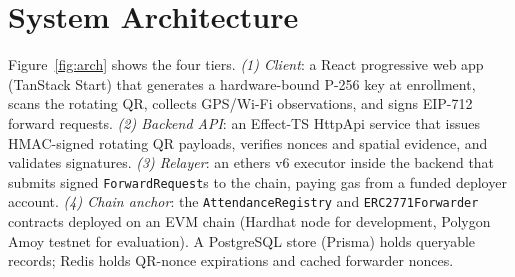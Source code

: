 \documentclass[conference]{IEEEtran}
\begin{document}
\section{System Architecture}
Figure~\ref{fig:arch} shows the four tiers. \emph{(1) Client}: a React
progressive web app (TanStack Start) that generates a hardware-bound P-256 key
at enrollment, scans the rotating QR, collects GPS/Wi-Fi observations, and
signs EIP-712 forward requests. \emph{(2) Backend API}: an Effect-TS HttpApi
service that issues HMAC-signed rotating QR payloads, verifies nonces and
spatial evidence, and validates signatures. \emph{(3) Relayer}: an ethers v6
executor inside the backend that submits signed \texttt{ForwardRequest}s to
the chain, paying gas from a funded deployer account. \emph{(4) Chain anchor}:
the \texttt{AttendanceRegistry} and \texttt{ERC2771Forwarder} contracts
deployed on an EVM chain (Hardhat node for development, Polygon Amoy testnet
for evaluation). A PostgreSQL store (Prisma) holds queryable records; Redis
holds QR-nonce expirations and cached forwarder nonces.
\end{document}
